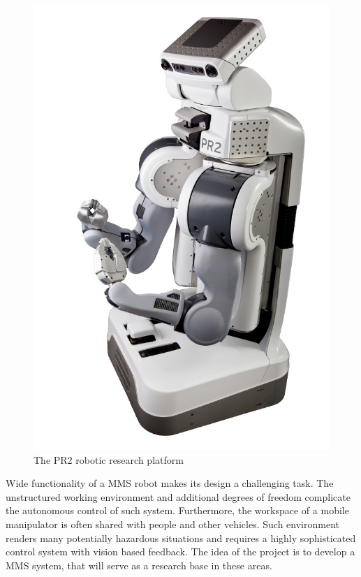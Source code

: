 \begin{figure}[H]
\centering
\includegraphics[totalheight=0.3\textheight]{fig/pr2}
\caption{The PR2 robotic research platform \cite{prspecs}}
\label{fig:pr2}
\end{figure}

Wide functionality of a MMS robot makes its design a challenging task. The unstructured working environment and additional degrees of freedom complicate the autonomous control of such system. Furthermore, the workspace of a mobile manipulator is often shared with people and other vehicles. Such environment renders many potentially hazardous situations and requires a highly sophisticated control system with vision based feedback. The idea of the project is to develop a MMS system, that will serve as a research base in these areas.

